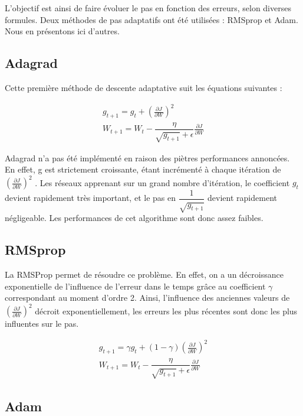 L'objectif est ainsi de faire évoluer le pas en fonction des erreurs, selon diverses formules. Deux méthodes de pas adaptatifs ont été utilisées : RMSprop et Adam. Nous en présentons ici d'autres.

\subsection{Adagrad}

Cette première méthode de descente adaptative suit les équations suivantes :

\begin{equation}
\begin{aligned}
g_{t+1} = g_t + (\frac{\partial J}{\partial W})^2 \\
W_{t+1} = W_t - \dfrac{\eta}{\sqrt{g_{t+1}} + \epsilon}\frac{\partial J}{\partial W}
\end{aligned}
\end{equation} 

Adagrad n'a pas été implémenté en raison des piètres performances annoncées. En effet, g est strictement croissante, étant incrémenté à chaque itération de $(\frac{\partial J}{\partial W})^2$ . Les réseaux apprenant sur un grand nombre d'itération, le coefficient $g_{t}$ devient rapidement très important, et le pas en $\dfrac{1}{\sqrt{g_{t+1}}}$ devient rapidement négligeable. Les performances de cet algorithme sont donc assez faibles.

\subsection{RMSprop}

La RMSProp permet de résoudre ce problème. En effet, on a un décroissance exponentielle de l'influence de l'erreur dans le temps grâce au coefficient $\gamma$ correspondant au moment d'ordre 2. Ainsi, l'influence des anciennes valeurs de $(\frac{\partial J}{\partial W})^2$ décroit exponentiellement, les erreurs les plus récentes sont donc les plus influentes sur le pas.

\begin{equation} 
\begin{aligned}
g_{t+1} = \gamma g_t + (1-\gamma)(\frac{\partial J}{\partial W})^2 \\
W_{t+1} = W_t - \dfrac{\eta}{\sqrt{g_{t+1}} + \epsilon}\frac{\partial J}{\partial W}
\end{aligned}
\end{equation} 

\subsection{Adam}

